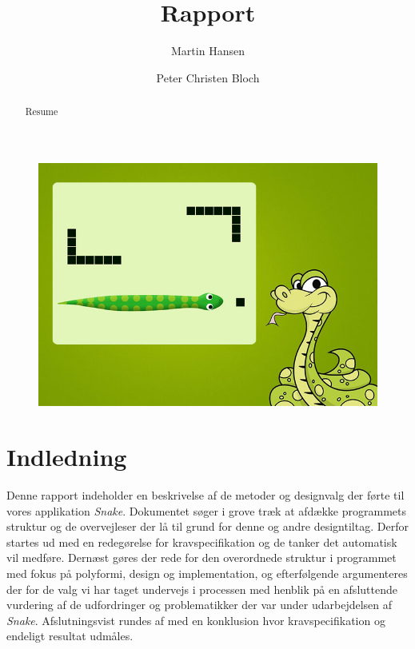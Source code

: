 \documentclass[]{article}
\title{Rapport}
\author{Martin Hansen \and Peter Christen Bloch}
\begin{document}
\maketitle

\begin{figure}[h!]
	\centering
	\includegraphics[width=\linewidth]{Snake_pic.jpg}
	\label{fig:diagram}
\end{figure}

\pagebreak %

\begin{abstract}
	Resume
\end{abstract}

\pagebreak %
\tableofcontents

\pagebreak
\section{Indledning}

Denne rapport indeholder en beskrivelse af de metoder og designvalg der førte til vores applikation \textit{Snake}. Dokumentet søger i grove træk at afdække programmets struktur og de overvejleser der lå til grund for denne og andre designtiltag. Derfor startes ud med en redegørelse for kravspecifikation og de tanker det automatisk vil medføre. Dernæst gøres der rede for den overordnede struktur i programmet med fokus på polyformi, design og implementation, og efterfølgende argumenteres der for de valg vi har taget undervejs i processen med henblik på en afsluttende vurdering af de udfordringer og problematikker der var under udarbejdelsen af \textit{Snake}. Afslutningsvist rundes af med en konklusion hvor kravspecifikation og endeligt resultat udmåles.
\end{document}
